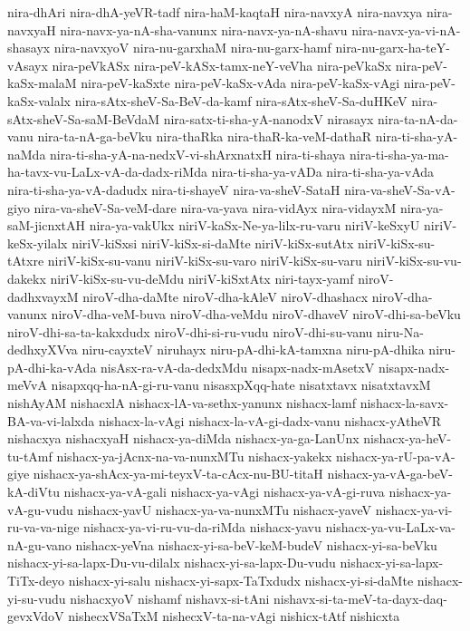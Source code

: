 {nira-dhAri
nira-dhA-yeVR-tadf
nira-haM-kaqtaH
nira-navxyA
nira-navxya
nira-navxyaH
nira-navx-ya-nA-sha-vanunx
nira-navx-ya-nA-shavu
nira-navx-ya-vi-nA-shasayx
nira-navxyoV
nira-nu-garxhaM
nira-nu-garx-hamf
nira-nu-garx-ha-teY-vAsayx
nira-peVkASx
nira-peV-kASx-tamx-neY-veVha
nira-peVkaSx
nira-peV-kaSx-malaM
nira-peV-kaSxte
nira-peV-kaSx-vAda
nira-peV-kaSx-vAgi
nira-peV-kaSx-valalx
nira-sAtx-sheV-Sa-BeV-da-kamf
nira-sAtx-sheV-Sa-duHKeV
nira-sAtx-sheV-Sa-saM-BeVdaM
nira-satx-ti-sha-yA-nanodxV
nirasayx
nira-ta-nA-da-vanu
nira-ta-nA-ga-beVku
nira-thaRka
nira-thaR-ka-veM-dathaR
nira-ti-sha-yA-naMda
nira-ti-sha-yA-na-nedxV-vi-shArxnatxH
nira-ti-shaya
nira-ti-sha-ya-ma-ha-tavx-vu-LaLx-vA-da-dadx-riMda
nira-ti-sha-ya-vADa
nira-ti-sha-ya-vAda
nira-ti-sha-ya-vA-dadudx
nira-ti-shayeV
nira-va-sheV-SataH
nira-va-sheV-Sa-vA-giyo
nira-va-sheV-Sa-veM-dare
nira-va-yava
nira-vidAyx
nira-vidayxM
nira-ya-saM-jicnxtAH
nira-ya-vakUkx
niriV-kaSx-Ne-ya-lilx-ru-varu
niriV-keSxyU
niriV-keSx-yilalx
niriV-kiSxsi
niriV-kiSx-si-daMte
niriV-kiSx-sutAtx
niriV-kiSx-su-tAtxre
niriV-kiSx-su-vanu
niriV-kiSx-su-varo
niriV-kiSx-su-varu
niriV-kiSx-su-vu-dakekx
niriV-kiSx-su-vu-deMdu
niriV-kiSxtAtx
niri-tayx-yamf
niroV-dadhxvayxM
niroV-dha-daMte
niroV-dha-kAleV
niroV-dhashacx
niroV-dha-vanunx
niroV-dha-veM-buva
niroV-dha-veMdu
niroV-dhaveV
niroV-dhi-sa-beVku
niroV-dhi-sa-ta-kakxdudx
niroV-dhi-si-ru-vudu
niroV-dhi-su-vanu
niru-Na-dedhxyXVva
niru-cayxteV
niruhayx
niru-pA-dhi-kA-tamxna
niru-pA-dhika
niru-pA-dhi-ka-vAda
nisAsx-ra-vA-da-dedxMdu
nisapx-nadx-mAsetxV
nisapx-nadx-meVvA
nisapxqq-ha-nA-gi-ru-vanu
nisasxpXqq-hate
nisatxtavx
nisatxtavxM
nishAyAM
nishacxlA
nishacx-lA-va-sethx-yanunx
nishacx-lamf
nishacx-la-savx-BA-va-vi-lalxda
nishacx-la-vAgi
nishacx-la-vA-gi-dadx-vanu
nishacx-yAtheVR
nishacxya
nishacxyaH
nishacx-ya-diMda
nishacx-ya-ga-LanUnx
nishacx-ya-heV-tu-tAmf
nishacx-ya-jAcnx-na-va-nunxMTu
nishacx-yakekx
nishacx-ya-rU-pa-vA-giye
nishacx-ya-shAcx-ya-mi-teyxV-ta-cAcx-nu-BU-titaH
nishacx-ya-vA-ga-beV-kA-diVtu
nishacx-ya-vA-gali
nishacx-ya-vAgi
nishacx-ya-vA-gi-ruva
nishacx-ya-vA-gu-vudu
nishacx-yavU
nishacx-ya-va-nunxMTu
nishacx-yaveV
nishacx-ya-vi-ru-va-va-nige
nishacx-ya-vi-ru-vu-da-riMda
nishacx-yavu
nishacx-ya-vu-LaLx-va-nA-gu-vano
nishacx-yeVna
nishacx-yi-sa-beV-keM-budeV
nishacx-yi-sa-beVku
nishacx-yi-sa-lapx-Du-vu-dilalx
nishacx-yi-sa-lapx-Du-vudu
nishacx-yi-sa-lapx-TiTx-deyo
nishacx-yi-salu
nishacx-yi-sapx-TaTxdudx
nishacx-yi-si-daMte
nishacx-yi-su-vudu
nishacxyoV
nishamf
nishavx-si-tAni
nishavx-si-ta-meV-ta-dayx-daq-gevxVdoV
nishecxVSaTxM
nishecxV-ta-na-vAgi
nishicx-tAtf
nishicxta
}
